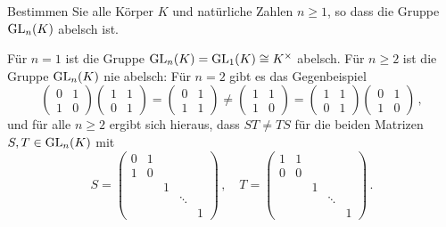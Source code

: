 \begin{question}
  Bestimmen Sie alle Körper $K$ und natürliche Zahlen $n \geq 1$, so dass die Gruppe $\operatorname{GL}_n(K)$ abelsch ist.
\end{question}

\begin{solution}
  Für $n = 1$ ist die Gruppe $\operatorname{GL}_n(K) = \operatorname{GL}_1(K) \cong K^\times$ abelsch.
  Für $n \geq 2$ ist die Gruppe $\operatorname{GL}_n(K)$ nie abelsch:
  Für $n = 2$ gibt es das Gegenbeispiel
  \[
          \begin{pmatrix}
            0 & 1 \\
            1 & 0
          \end{pmatrix}
          \begin{pmatrix}
            1 & 1 \\
            0 & 1
          \end{pmatrix}
    =     \begin{pmatrix}
            0 & 1 \\
            1 & 1
          \end{pmatrix}
    \neq  \begin{pmatrix}
            1 & 1 \\
            1 & 0
          \end{pmatrix}
    =     \begin{pmatrix}
            1 & 1 \\
            0 & 1
          \end{pmatrix}
          \begin{pmatrix}
            0 & 1 \\
            1 & 0
          \end{pmatrix} \,,
  \]
  und für alle $n \geq 2$ ergibt sich hieraus, dass $ST \neq TS$ für die beiden Matrizen $S, T \in \operatorname{GL}_n(K)$ mit
  \[
      S
    = \begin{pmatrix}
        0 & 1 &   &         &   \\
        1 & 0 &   &         &   \\
          &   & 1 &         &   \\
          &   &   & \ddots  &   \\
          &   &   &         & 1
      \end{pmatrix} \,,
      \quad
      T
    = \begin{pmatrix}
        1 & 1 &   &         &   \\
        0 & 0 &   &         &   \\
          &   & 1 &         &   \\
          &   &   & \ddots  &   \\
          &   &   &         & 1
      \end{pmatrix} \,.
  \]
\end{solution}


